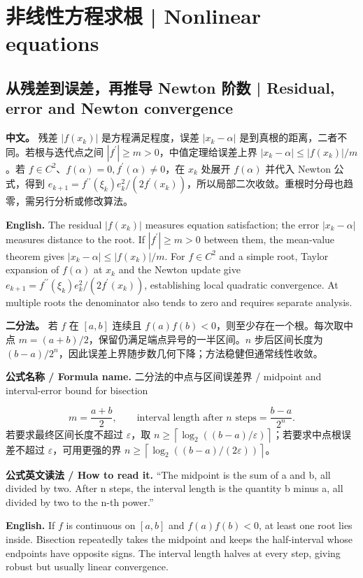 \documentclass[UTF8,11pt,a4paper]{ctexart}
\newcommand{\EN}[1]{\par\noindent\textbf{English.} #1\par}
\newcommand{\READ}[1]{\par\noindent\textbf{公式英文读法 / How to read it.} #1\par}
\newcommand{\FORMULA}[2]{\par\noindent\textbf{公式名称 / Formula name.} #1 / #2\par}
\newcommand{\APS}[2]{\par\noindent\textbf{中文。} #1\par\noindent\textbf{English.} #2\par\smallskip}
\begin{document}
\section{非线性方程求根 | Nonlinear equations}
\subsection{从残差到误差，再推导 Newton 阶数 | Residual, error and Newton convergence}
\APS{残差 $|f(x_k)|$ 是方程满足程度，误差 $|x_k-\alpha|$ 是到真根的距离，二者不同。若根与迭代点之间 $|f^{\prime}|\ge m>0$，中值定理给误差上界 $|x_k-\alpha|\le|f(x_k)|/m$。若 $f\in C^2$、$f(\alpha)=0,f^{\prime}(\alpha)\ne0$，在 $x_k$ 处展开 $f(\alpha)$ 并代入 Newton 公式，得到 $e_{k+1}=f^{\prime\prime}(\xi_k)e_k^2/(2f^{\prime}(x_k))$，所以局部二次收敛。重根时分母也趋零，需另行分析或修改算法。}{The residual $|f(x_k)|$ measures equation satisfaction; the error $|x_k-\alpha|$ measures distance to the root. If $|f^{\prime}|\ge m>0$ between them, the mean-value theorem gives $|x_k-\alpha|\le|f(x_k)|/m$. For $f\in C^2$ and a simple root, Taylor expansion of $f(\alpha)$ at $x_k$ and the Newton update give $e_{k+1}=f^{\prime\prime}(\xi_k)e_k^2/(2f^{\prime}(x_k))$, establishing local quadratic convergence. At multiple roots the denominator also tends to zero and requires separate analysis.}

\noindent\textbf{二分法。} 若 $f$ 在 $[a,b]$ 连续且 $f(a)f(b)<0$，则至少存在一个根。每次取中点 $m=(a+b)/2$，保留仍满足端点异号的一半区间。$n$ 步后区间长度为 $(b-a)/2^n$，因此误差上界随步数几何下降；方法稳健但通常线性收敛。
\FORMULA{二分法的中点与区间误差界}{midpoint and interval-error bound for bisection}
\[
m=\frac{a+b}{2},\qquad \text{interval length after }n\text{ steps}=\frac{b-a}{2^n}.
\]
若要求最终区间长度不超过 $\varepsilon$，取 $n\ge\left\lceil\log_2((b-a)/\varepsilon)\right\rceil$；若要求中点根误差不超过 $\varepsilon$，可用更强的界 $n\ge\left\lceil\log_2((b-a)/(2\varepsilon))\right\rceil$。
\READ{“The midpoint is the sum of a and b, all divided by two. After n steps, the interval length is the quantity b minus a, all divided by two to the n-th power.”}
\EN{If $f$ is continuous on $[a,b]$ and $f(a)f(b)<0$, at least one root lies inside. Bisection repeatedly takes the midpoint and keeps the half-interval whose endpoints have opposite signs. The interval length halves at every step, giving robust but usually linear convergence.}
\end{document}
